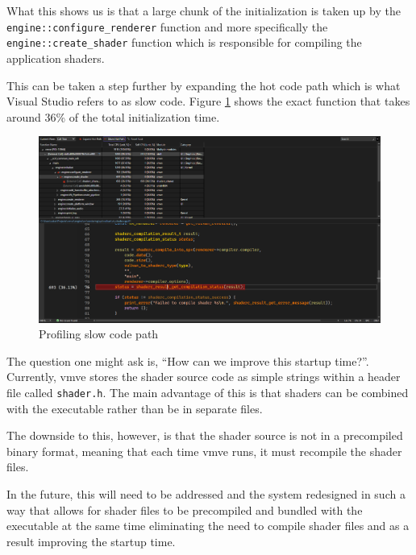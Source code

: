 \documentclass[11pt]{article}
\begin{document}
What this shows us is that a large chunk of the initialization is taken up by
the \lstinline{engine::configure_renderer} function and more specifically the
\lstinline{engine::create_shader} function which is responsible for compiling
the application shaders.

This can be taken a step further by expanding the hot code path which is what
Visual Studio refers to as slow code. Figure \ref{fig:vmve_slow_code_path} shows
the exact function that takes around 36\% of the total initialization time.
\begin{figure}[H]
  \centering
  \includegraphics[width=\textwidth]{images/startup_profiling_slow_shader_compile.png}
  \caption{Profiling slow code path}
  \label{fig:vmve_slow_code_path}
\end{figure}

The question one might ask is, ``How can we improve this startup time?''.
Currently, \gls*{vmve} stores the shader source code as simple strings within a
header file called \lstinline{shader.h}. The main advantage of this is that
shaders can be combined with the executable rather than be in separate files.

The downside to this, however, is that the shader source is not in a precompiled
binary format, meaning that each time \gls*{vmve} runs, it must recompile the
shader files. 

In the future, this will need to be addressed and the system redesigned in such
a way that allows for shader files to be precompiled and bundled with the
executable at the same time eliminating the need to compile shader files and as
a result improving the startup time.
\end{document}

